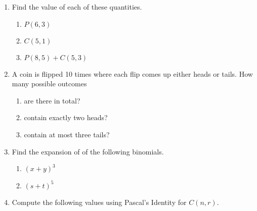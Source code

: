 \documentclass[12pt]{article}
\begin{document}
\begin{enumerate} %


\item Find the value of each of these quantities.

\begin{enumerate}

    \item $P(6, 3)$
    \item $C(5, 1)$
    \item $P(8, 5) + C(5, 3)$

\end{enumerate}

\vspace{1.5in}


\item A coin is flipped 10 times where each flip comes up either heads or tails. How many possible outcomes

\begin{enumerate}

    \item are there in total?
    \item contain exactly two heads?
    \item contain at most three tails?

\end{enumerate}

\newpage



\item Find the expansion of of the following binomials.

\begin{enumerate}

    \item $(x+y)^{3}$
    \item $(s+t)^{5}$

\end{enumerate}

\vspace{2in}

\item Compute the following values using Pascal's Identity for $C(n, r)$.

\begin{enumerate}


\end{enumerate}
\end{enumerate}
\end{document}
